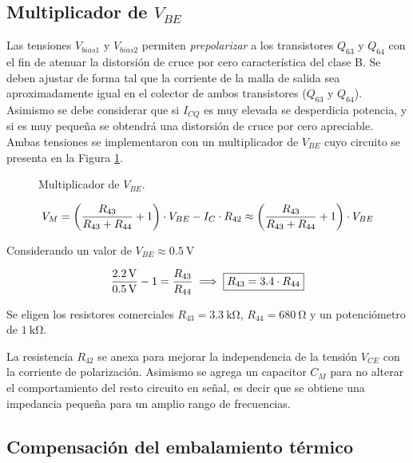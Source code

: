 \subsection{Multiplicador de $V_{BE}$}

Las tensiones $V_{bias1}$ y $V_{bias2}$ permiten \textit{prepolarizar} a los transistores $Q_{63}$ y $Q_{64}$ con el fin de atenuar la distorsión de cruce por cero característica del clase B. Se deben ajustar de forma tal que la corriente de la malla de salida sea aproximadamente igual en el colector de ambos transistores ($Q_{63}$ y $Q_{64}$). Asimismo se debe considerar que si $I_{CQ}$ es muy elevada se desperdicia potencia, y si es muy pequeña se obtendrá una distorsión de cruce por cero apreciable. Ambas tensiones se implementaron con un multiplicador de $V_{BE}$ cuyo circuito se presenta en la Figura \ref{fig.multiplicador}.

	\begin{figure}[H]
		\centering
		\scalebox{0.5}{}
		\caption{Multiplicador de $V_{BE}$.}
		\label{fig.multiplicador}
	\end{figure}


	\begin{equation}
		\centering
		V_M = \left( \frac{R_{43}}{R_{43} + R_{44}} +1 \right) \cdot V_{BE} - I_C \cdot R_{42} \approx  \left( \frac{R_{43}}{R_{43} + R_{44}} +1 \right) \cdot V_{BE}
	\end{equation}

	 Considerando un valor de $V_{BE} \approx \SI{0.5}{\volt}$

	 \begin{equation}
	 	\centering
		\frac{\SI{2.2}{\volt}}{\SI{0.5}{\volt}} -1 = \frac{R_{43}}{R_{44}} \implies \boxed{R_{43} = \num{3,4} \cdot R_{44}}
	\end{equation}

	Se eligen los resistores comerciales $R_{43} = \SI{3.3}{\kilo\ohm}$, $R_{44} = \SI{680}{\ohm}$ y un potenciómetro de $\SI{1}{\kilo\ohm}$. 

	La resistencia $R_{42}$ se anexa para mejorar la independencia de la tensión $V_{CE}$ con la corriente de polarización. Asimismo se agrega un capacitor $C_M$ para no alterar el comportamiento del resto circuito en señal, es decir que se obtiene una impedancia pequeña para un amplio rango de frecuencias. 
	
\subsection{Compensación del embalamiento térmico}

